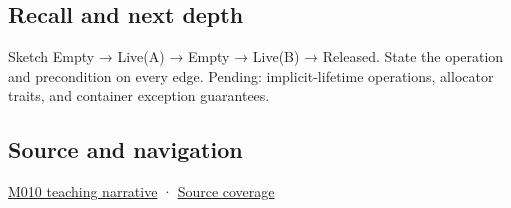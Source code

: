 \subsection{Recall and next depth}\label{appendix-f56c3e43fd4e-recall-and-next-depth}

Sketch Empty → Live(A) → Empty → Live(B) → Released. State the operation and precondition on every edge. Pending: implicit-lifetime operations, allocator traits, and container exception guarantees.

\subsection{Source and navigation}\label{appendix-f56c3e43fd4e-source-and-navigation}

\hyperref[01-foundations-i-ch004-placement-construction-reuses-storage-it-does-not-allocate-it]{M010 teaching narrative} · \hyperref[appendix-fd090d982a15-m010---parts-148-160]{Source coverage}
